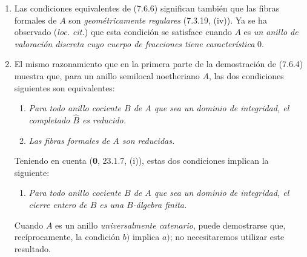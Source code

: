 \begin{remarks}[7.6.7]
\label{IV.2.s7.6.7-fr}
\begin{enumerate}
\item[(i)] Las condiciones equivalentes de (7.6.6) significan también
que las fibras formales de $A$ son \emph{geométricamente regulares} (7.3.19, (iv)).
Ya se ha observado (\emph{loc. cit.}) que esta condición se satisface cuando
$A$ es \emph{un anillo de valoración discreta cuyo cuerpo de fracciones tiene
característica} 0.

\item[(ii)] El mismo razonamiento que en la primera parte de la
demostración de (7.6.4) muestra que, para un anillo semilocal noetheriano $A$,
las dos condiciones siguientes son equivalentes:
\begin{enumerate}
\item[a)] \emph{Para todo anillo cociente $B$ de $A$ que sea un dominio de
integridad, el completado $\widehat B$ es reducido.}
\item[a$'$)] \emph{Las fibras formales de $A$ son reducidas.}
\end{enumerate}

Teniendo en cuenta (\textbf 0, 23.1.7, (i)), estas dos condiciones implican la siguiente:
\begin{enumerate}
\item[b)] \emph{Para todo anillo cociente $B$ de $A$ que sea un dominio de
integridad, el cierre entero de $B$ es una $B$-álgebra finita.}
\end{enumerate}

Cuando $A$ es un anillo \emph{universalmente catenario}, puede demostrarse que,
recíprocamente, la condición $b)$ implica $a)$; no necesitaremos utilizar
este resultado.
\end{enumerate}
\end{remarks}
